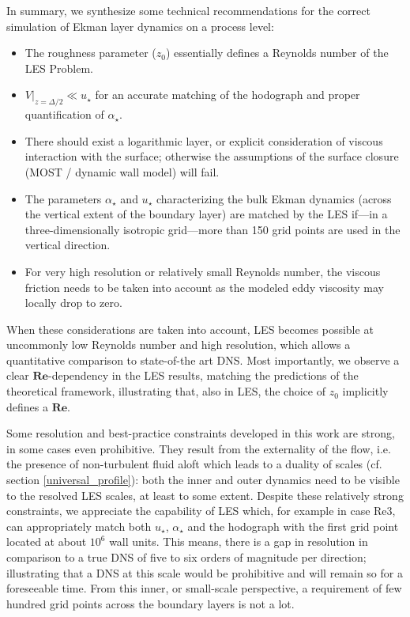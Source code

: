 \documentclass[smallcondensed,final]{svjour3}
\newcommand{\RE}{\mathbf{Re}}
\begin{document}
In summary, we synthesize some technical recommendations for the correct simulation of Ekman layer dynamics on a process level:
\begin{itemize}
\item The roughness parameter ($z_0$) essentially defines a Reynolds number of the LES Problem.
\item $V|_{z=\Delta/2} \ll u_\star$ for an accurate matching of the hodograph and proper quantification of $\alpha_\star$.
\item There should exist a logarithmic layer, or explicit consideration of viscous interaction with the surface; otherwise the assumptions of the surface closure (MOST / dynamic wall model) will fail.
\item The parameters $\alpha_\star$ and $u_\star$ characterizing the bulk Ekman dynamics (across the vertical extent of the boundary layer) are matched by the LES if---in a three-dimensionally isotropic grid---more than 150 grid points are used in the vertical direction.
\item For very high resolution or relatively small Reynolds number, the viscous friction needs to be taken into account as the modeled eddy viscosity may locally drop to zero.
\end{itemize}

When these considerations are taken into account, LES becomes possible at uncommonly low Reynolds number and  high resolution, which allows a quantitative comparison to state-of-the art DNS. Most importantly, we observe a clear $\RE$-dependency in the LES results, matching the predictions of the theoretical framework, illustrating that, also in  LES, the choice of $z_0$ implicitly defines a $\RE$.  

Some resolution and best-practice constraints developed in this work are strong, in some cases even prohibitive. They result from the externality of the flow, i.e. the presence of non-turbulent fluid aloft which leads to a duality of scales (cf. section \ref{universal_profile}): both the inner and outer dynamics need to be visible to the resolved LES scales, at least to some extent. Despite these relatively strong constraints, we appreciate the capability of LES which, for example in case Re3, can appropriately match both $u_\star$, $\alpha_\star$ and the hodograph with the first grid point located at about $10^6$ wall units. This means, there is a gap in resolution in comparison to a true DNS of five to six orders of magnitude per direction; illustrating that a DNS at this scale would be prohibitive and will remain so for a foreseeable time. From this inner, or small-scale perspective, a requirement of few hundred grid points across the boundary layers is not a lot.
\end{document}
